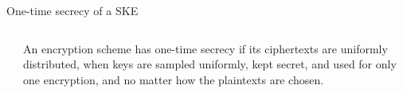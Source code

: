 \documentclass[aspectratio=169, lualatex, handout]{beamer}
\begin{document}
\begin{frame}{One-time secrecy of a SKE}
	\begin{columns}[c]
		\begin{column}{0.5\textwidth}
		\end{column}
		\begin{column}{0.5\textwidth}
			An encryption scheme has one-time secrecy if its ciphertexts are uniformly distributed, when keys are sampled uniformly, kept secret, and used for only one encryption, and no matter how the plaintexts are chosen.
		\end{column}
	\end{columns}
\end{frame}
\end{document}
